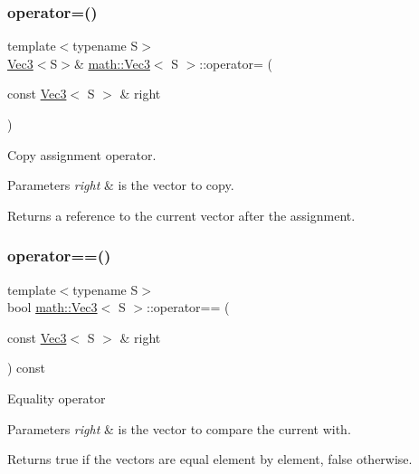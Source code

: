 \subsubsection{\texorpdfstring{operator=()}{operator=()}}
{\footnotesize\ttfamily template$<$typename S$>$ \\
\hyperlink{classmath_1_1_vec3}{Vec3}$<$S$>$\& \hyperlink{classmath_1_1_vec3}{math\+::\+Vec3}$<$ S $>$\+::operator= (\begin{DoxyParamCaption}\item[{const \hyperlink{classmath_1_1_vec3}{Vec3}$<$ S $>$ \&}]{right }\end{DoxyParamCaption})\hspace{0.3cm}{\ttfamily [inline]}}

Copy assignment operator.


\begin{DoxyParams}{Parameters}
{\em right} & is the vector to copy.\\
\hline
\end{DoxyParams}
\begin{DoxyReturn}{Returns}
a reference to the current vector after the assignment. 
\end{DoxyReturn}
\mbox{\label{classmath_1_1_vec3_a7d6020565ceec5656b4d5880c8a79a65}} 
\subsubsection{\texorpdfstring{operator==()}{operator==()}}
{\footnotesize\ttfamily template$<$typename S$>$ \\
bool \hyperlink{classmath_1_1_vec3}{math\+::\+Vec3}$<$ S $>$\+::operator== (\begin{DoxyParamCaption}\item[{const \hyperlink{classmath_1_1_vec3}{Vec3}$<$ S $>$ \&}]{right }\end{DoxyParamCaption}) const\hspace{0.3cm}{\ttfamily [inline]}}

Equality operator


\begin{DoxyParams}{Parameters}
{\em right} & is the vector to compare the current with.\\
\hline
\end{DoxyParams}
\begin{DoxyReturn}{Returns}
true if the vectors are equal element by element, false otherwise. 
\end{DoxyReturn}
\mbox{\label{classmath_1_1_vec3_a1748c205116e0af40aa83f2b6779e793}} 
